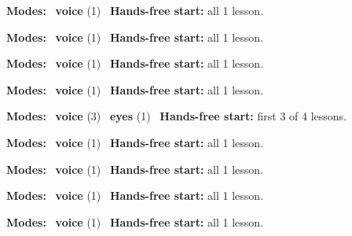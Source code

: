 \expandafter\def\csname hlchaptermodality51\endcsname{%
  {\small\noindent
    \textbf{Modes:} \hlvoicesign{}~\textbf{voice} (1)\quad
    \hlvoicesign{}~\textbf{Hands-free start:} all 1 lesson.%
    \par}\medskip
}

\expandafter\def\csname hlchaptermodality52\endcsname{%
  {\small\noindent
    \textbf{Modes:} \hlvoicesign{}~\textbf{voice} (1)\quad
    \hlvoicesign{}~\textbf{Hands-free start:} all 1 lesson.%
    \par}\medskip
}

\expandafter\def\csname hlchaptermodality53\endcsname{%
  {\small\noindent
    \textbf{Modes:} \hlvoicesign{}~\textbf{voice} (1)\quad
    \hlvoicesign{}~\textbf{Hands-free start:} all 1 lesson.%
    \par}\medskip
}

\expandafter\def\csname hlchaptermodality54\endcsname{%
  {\small\noindent
    \textbf{Modes:} \hlvoicesign{}~\textbf{voice} (1)\quad
    \hlvoicesign{}~\textbf{Hands-free start:} all 1 lesson.%
    \par}\medskip
}

\expandafter\def\csname hlchaptermodality55\endcsname{%
  {\small\noindent
    \textbf{Modes:} \hlvoicesign{}~\textbf{voice} (3) \quad \hlsightsign{}~\textbf{eyes} (1)\quad
    \hlvoicesign{}~\textbf{Hands-free start:} first 3 of 4 lessons.%
    \par}\medskip
}

\expandafter\def\csname hlchaptermodality56\endcsname{%
  {\small\noindent
    \textbf{Modes:} \hlvoicesign{}~\textbf{voice} (1)\quad
    \hlvoicesign{}~\textbf{Hands-free start:} all 1 lesson.%
    \par}\medskip
}

\expandafter\def\csname hlchaptermodality57\endcsname{%
  {\small\noindent
    \textbf{Modes:} \hlvoicesign{}~\textbf{voice} (1)\quad
    \hlvoicesign{}~\textbf{Hands-free start:} all 1 lesson.%
    \par}\medskip
}

\expandafter\def\csname hlchaptermodality58\endcsname{%
  {\small\noindent
    \textbf{Modes:} \hlvoicesign{}~\textbf{voice} (1)\quad
    \hlvoicesign{}~\textbf{Hands-free start:} all 1 lesson.%
    \par}\medskip
}

\expandafter\def\csname hlchaptermodality59\endcsname{%
  {\small\noindent
    \textbf{Modes:} \hlvoicesign{}~\textbf{voice} (1)\quad
    \hlvoicesign{}~\textbf{Hands-free start:} all 1 lesson.%
    \par}\medskip
}

